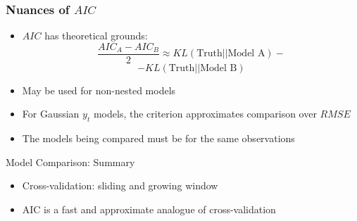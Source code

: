 \begin{frame}
	\frametitle{Nuances of $AIC$}
	
	\begin{itemize}[<+->]
		\item $AIC$ has \alert{theoretical grounds}:
		\[
		\frac{AIC_A - AIC_B}{2} \approx KL(\text{Truth} || \text{Model A}) - \]
		\[
		- KL(\text{Truth} || \text{Model B})
		\]
		\item May be used \alert{for non-nested models}
		\item For Gaussian $y_t$ models, the criterion approximates \alert{comparison over $RMSE$}
		\item The models being compared must be for the \alert{same} observations
	\end{itemize}
	
	
	
\end{frame}


\begin{frame}{Model Comparison: Summary}
	
	\begin{itemize}[<+->]
		\item Cross-validation: sliding and growing window
		\item AIC is a fast and approximate analogue of cross-validation
	\end{itemize}
\end{frame}
